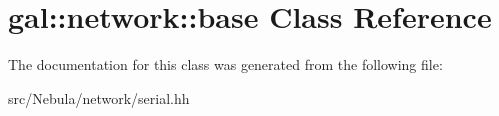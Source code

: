 \hypertarget{classgal_1_1network_1_1base}{\section{gal\-:\-:network\-:\-:base Class Reference}
\label{classgal_1_1network_1_1base}
}


The documentation for this class was generated from the following file\-:\begin{DoxyCompactItemize}
\item 
src/\-Nebula/network/serial.\-hh\end{DoxyCompactItemize}
